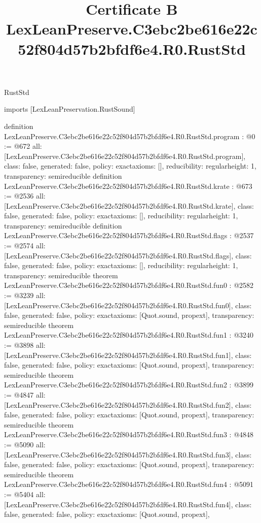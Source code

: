 \begin{lexlean}{RustStd}
\title{Certificate B LexLeanPreserve.C3ebc2be616e22c52f804d57b2bfdf6e4.R0.RustStd}
\begin{coremodule}
imports [LexLeanPreservation.RustSound]

definition LexLeanPreserve.C3ebc2be616e22c52f804d57b2bfdf6e4.R0.RustStd.program : @0 := @672 {
  all: [LexLeanPreserve.C3ebc2be616e22c52f804d57b2bfdf6e4.R0.RustStd.program],
  class: false,
  generated: false,
  policy: exact{axioms: []},
  reducibility: regular{height: 1},
  transparency: semireducible
}
definition LexLeanPreserve.C3ebc2be616e22c52f804d57b2bfdf6e4.R0.RustStd.krate : @673 := @2536 {
  all: [LexLeanPreserve.C3ebc2be616e22c52f804d57b2bfdf6e4.R0.RustStd.krate],
  class: false,
  generated: false,
  policy: exact{axioms: []},
  reducibility: regular{height: 1},
  transparency: semireducible
}
definition LexLeanPreserve.C3ebc2be616e22c52f804d57b2bfdf6e4.R0.RustStd.flags : @2537 := @2574 {
  all: [LexLeanPreserve.C3ebc2be616e22c52f804d57b2bfdf6e4.R0.RustStd.flags],
  class: false,
  generated: false,
  policy: exact{axioms: []},
  reducibility: regular{height: 1},
  transparency: semireducible
}
theorem LexLeanPreserve.C3ebc2be616e22c52f804d57b2bfdf6e4.R0.RustStd.fun0 : @2582 := @3239 {
  all: [LexLeanPreserve.C3ebc2be616e22c52f804d57b2bfdf6e4.R0.RustStd.fun0],
  class: false,
  generated: false,
  policy: exact{axioms: [Quot.sound, propext]},
  transparency: semireducible
}
theorem LexLeanPreserve.C3ebc2be616e22c52f804d57b2bfdf6e4.R0.RustStd.fun1 : @3240 := @3898 {
  all: [LexLeanPreserve.C3ebc2be616e22c52f804d57b2bfdf6e4.R0.RustStd.fun1],
  class: false,
  generated: false,
  policy: exact{axioms: [Quot.sound, propext]},
  transparency: semireducible
}
theorem LexLeanPreserve.C3ebc2be616e22c52f804d57b2bfdf6e4.R0.RustStd.fun2 : @3899 := @4847 {
  all: [LexLeanPreserve.C3ebc2be616e22c52f804d57b2bfdf6e4.R0.RustStd.fun2],
  class: false,
  generated: false,
  policy: exact{axioms: [Quot.sound, propext]},
  transparency: semireducible
}
theorem LexLeanPreserve.C3ebc2be616e22c52f804d57b2bfdf6e4.R0.RustStd.fun3 : @4848 := @5090 {
  all: [LexLeanPreserve.C3ebc2be616e22c52f804d57b2bfdf6e4.R0.RustStd.fun3],
  class: false,
  generated: false,
  policy: exact{axioms: [Quot.sound, propext]},
  transparency: semireducible
}
theorem LexLeanPreserve.C3ebc2be616e22c52f804d57b2bfdf6e4.R0.RustStd.fun4 : @5091 := @5404 {
  all: [LexLeanPreserve.C3ebc2be616e22c52f804d57b2bfdf6e4.R0.RustStd.fun4],
  class: false,
  generated: false,
  policy: exact{axioms: [Quot.sound, propext]},
}
\end{coremodule}
\end{lexlean}
